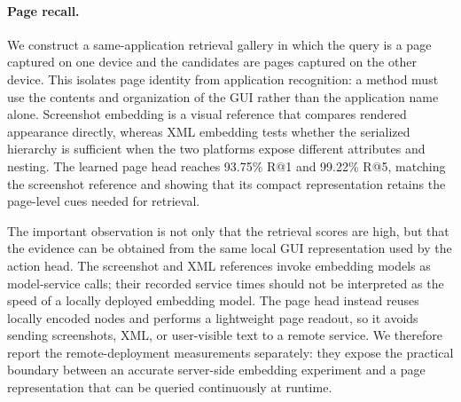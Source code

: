\begin{table}[t]
  \centering
  \scriptsize
  \caption{Action-grounding results on the current ASE Test protocol.  All rows
  use the same 98 page pairs, 196 directions, and all-node candidate policy.
  LightGlue reports mean page-pair inference time, whereas the local matcher
  reports mean action-head time.}
  \label{tab:omnitransfer-components}
\end{table}

\paragraph{Page recall.}
We construct a same-application retrieval gallery in which the query is a page
captured on one device and the candidates are pages captured on the other
device.  This isolates page identity from application recognition: a method
must use the contents and organization of the GUI rather than the application
name alone.  Screenshot embedding is a visual reference that compares rendered
appearance directly, whereas XML embedding tests whether the serialized
hierarchy is sufficient when the two platforms expose different attributes and
nesting.  The learned page head reaches 93.75\% R@1 and 99.22\% R@5, matching
the screenshot reference and showing that its compact representation retains
the page-level cues needed for retrieval.

The important observation is not only that the retrieval scores are high, but
that the evidence can be obtained from the same local GUI representation used
by the action head.  The screenshot and XML references invoke embedding models
as model-service calls; their recorded service times should not be interpreted
as the speed of a locally deployed embedding model.  The page head instead
reuses locally encoded nodes and performs a lightweight page readout, so it
avoids sending screenshots, XML, or user-visible text to a remote service.  We
therefore report the remote-deployment measurements separately: they expose
the practical boundary between an accurate server-side embedding experiment
and a page representation that can be queried continuously at runtime.

